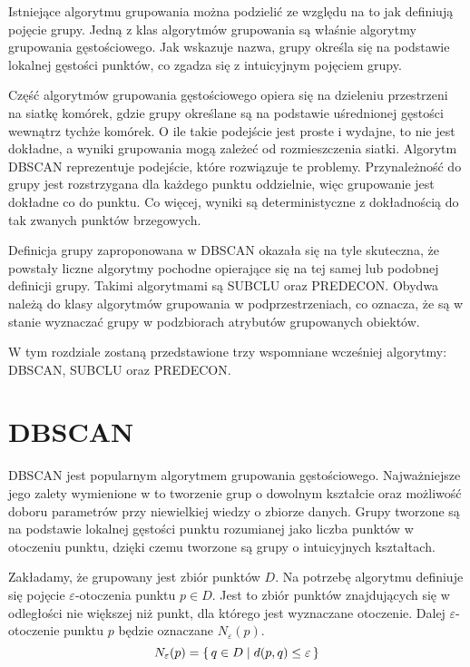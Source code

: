 
Istniejące algorytmu grupowania można podzielić ze względu na to jak definiują pojęcie grupy. Jedną z klas algorytmów grupowania są właśnie algorytmy grupowania gęstościowego. Jak wskazuje nazwa, grupy określa się na podstawie lokalnej gęstości punktów, co zgadza się z intuicyjnym pojęciem grupy.\par

Część algorytmów grupowania gęstościowego opiera się na dzieleniu przestrzeni na siatkę komórek, gdzie grupy określane są na podstawie uśrednionej gęstości wewnątrz tychże komórek. O ile takie podejście jest proste i wydajne, to nie jest dokładne, a wyniki grupowania mogą zależeć od rozmieszczenia siatki. Algorytm DBSCAN reprezentuje podejście, które rozwiązuje te problemy. Przynależność do grupy jest rozstrzygana dla każdego punktu oddzielnie, więc grupowanie jest dokładne co do punktu. Co więcej, wyniki są deterministyczne z dokładnością do tak zwanych punktów brzegowych.\par
Definicja grupy zaproponowana w DBSCAN okazała się na tyle skuteczna, że powstały liczne algorytmy pochodne opierające się na tej samej lub podobnej definicji grupy. Takimi algorytmami są SUBCLU oraz PREDECON. Obydwa należą do klasy algorytmów grupowania w podprzestrzeniach, co oznacza, że są w stanie wyznaczać grupy w podzbiorach atrybutów grupowanych obiektów.\par
W tym rozdziale zostaną przedstawione trzy wspomniane wcześniej algorytmy: DBSCAN, SUBCLU oraz PREDECON.

\section{DBSCAN}
DBSCAN jest popularnym algorytmem grupowania gęstościowego. Najważniejsze jego zalety wymienione w \cite{dbscan} to tworzenie grup o dowolnym kształcie oraz możliwość doboru parametrów przy niewielkiej wiedzy o zbiorze danych. Grupy tworzone są na podstawie lokalnej gęstości punktu rozumianej jako liczba punktów w otoczeniu punktu, dzięki czemu tworzone są grupy o intuicyjnych kształtach.

Zakładamy, że grupowany jest zbiór punktów $ D $. Na potrzebę algorytmu definiuje się pojęcie $ \varepsilon $-otoczenia punktu $ p \in D $. Jest to zbiór punktów znajdujących się w odległości nie większej niż punkt, dla którego jest wyznaczane otoczenie. Dalej $ \varepsilon $-otoczenie punktu $ p $ będzie oznaczane $ N_\varepsilon(p) $.
\begin{equation}\label{eps-neighbourhood}
	N_\varepsilon(p) = \set{q \in D | d(p, q) \le \varepsilon}
\end{equation}

